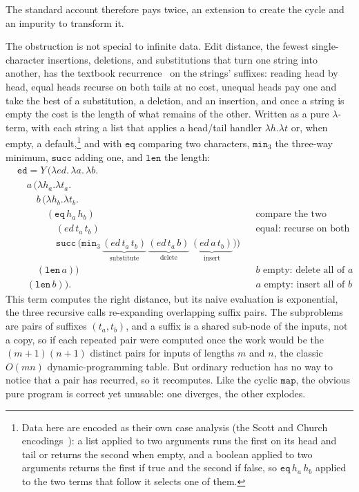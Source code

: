 The standard account therefore pays twice, an extension to create the cycle and an impurity to
transform it.

The obstruction is not special to infinite data. Edit distance, the fewest single-character
insertions, deletions, and substitutions that turn one string into another, has the textbook
recurrence~\cite{wagner1974-string-correction} on the strings' suffixes: reading head by head, equal heads recurse on both tails at
no cost, unequal heads pay one and take the best of a substitution, a deletion, and an insertion,
and once a string is empty the cost is the length of what remains of the other. Written as a pure
$\lambda$-term, with each string a list that applies a head/tail handler $\lambda h.\lambda t$ or,
when empty, a default,\footnote{Data here are encoded as their own case analysis (the Scott and
Church encodings~\cite{mogensen1992-self-interpretation}): a list applied to two arguments runs the first on its head and tail or returns
the second when empty, and a boolean applied to two arguments returns the first if true and the
second if false, so $\mathtt{eq}\,h_a\,h_b$ applied to the two terms that follow it selects one of
them.} and with $\mathtt{eq}$ comparing two characters, $\mathtt{min}_3$ the three-way minimum,
$\mathtt{succ}$ adding one, and $\mathtt{len}$ the length:
\[
  \begin{aligned}
    &\mathtt{ed} = Y\,\big(\lambda\mathit{ed}.\,\lambda a.\,\lambda b.\\
    &\quad a\,\big(\lambda h_a.\lambda t_a.\\
    &\qquad b\,\big(\lambda h_b.\lambda t_b.\\
    &\qquad\quad (\mathtt{eq}\,h_a\,h_b)
        &&\text{compare the two heads}\\
    &\qquad\qquad (\mathit{ed}\,t_a\,t_b)
        &&\text{equal: recurse on both tails, no cost}\\
    &\qquad\qquad \mathtt{succ}\,\big(\mathtt{min}_3\,
        \underbrace{(\mathit{ed}\,t_a\,t_b)}_{\text{substitute}}\,
        \underbrace{(\mathit{ed}\,t_a\,b)}_{\text{delete}}\,
        \underbrace{(\mathit{ed}\,a\,t_b)}_{\text{insert}}\big)\big)\\
    &\qquad (\mathtt{len}\,a)\big)
        &&\text{$b$ empty: delete all of $a$}\\
    &\quad (\mathtt{len}\,b)\big).
        &&\text{$a$ empty: insert all of $b$}
  \end{aligned}
\]
This term computes the right distance, but its naive evaluation is exponential, the three
recursive calls re-expanding overlapping suffix pairs. The subproblems are pairs of suffixes
$(t_a,t_b)$, and a suffix is a shared sub-node of the inputs, not a copy, so if each repeated
pair were computed once the work would be the $(m{+}1)(n{+}1)$ distinct pairs for inputs of
lengths $m$ and $n$, the classic $O(mn)$ dynamic-programming table. But ordinary reduction has
no way to notice that a pair has recurred, so it recomputes. Like the cyclic $\mathtt{map}$, the obvious pure program is correct yet
unusable: one diverges, the other explodes.

